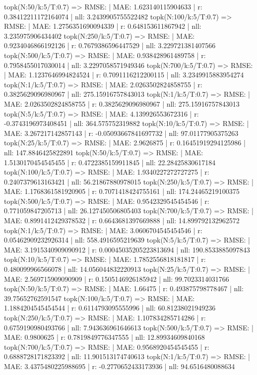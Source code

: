 topk(N:50/k:5/T:0.7) => RMSE: | MAE: 1.623140115904633 | r: 0.38412211172164074 | nll: 3.2439905755522482
topk(N:100/k:5/T:0.7) => RMSE: | MAE: 1.2756351690094339 | r: 0.648153611867942 | nll: 3.235975906434402
topk(N:250/k:5/T:0.7) => RMSE: | MAE: 0.9234046866192126 | r: 0.7679386596447529 | nll: 3.229721381407566
topk(N:500/k:5/T:0.7) => RMSE: | MAE: 0.938428961489758 | r: 0.7958455017030014 | nll: 3.2297058571949346
topk(N:700/k:5/T:0.7) => RMSE: | MAE: 1.1237646994824524 | r: 0.7091116212200115 | nll: 3.2349915883954274
topk(N:1/k:5/T:0.7) => RMSE: | MAE: 2.0263502824858755 | r: 0.3825629096980967 | nll: 275.15916757843013
topk(N:1/k:5/T:0.7) => RMSE: | MAE: 2.0263502824858755 | r: 0.3825629096980967 | nll: 275.15916757843013
topk(N:5/k:5/T:0.7) => RMSE: | MAE: 4.139926553672316 | r: -0.3743196973408451 | nll: 364.575752319882
topk(N:10/k:5/T:0.7) => RMSE: | MAE: 3.267217142857143 | r: -0.05093667841697732 | nll: 97.01177905375263
topk(N:25/k:5/T:0.7) => RMSE: | MAE: 2.9626875 | r: 0.16451919294125986 | nll: 147.8846425822891
topk(N:50/k:5/T:0.7) => RMSE: | MAE: 1.5130170454545455 | r: 0.4722385159911845 | nll: 22.28425830617184
topk(N:100/k:5/T:0.7) => RMSE: | MAE: 1.9340227272727275 | r: 0.2407379613163421 | nll: 56.21867880978015
topk(N:250/k:5/T:0.7) => RMSE: | MAE: 1.1768361581920905 | r: 0.7071418424755161 | nll: 174.24465219100375
topk(N:500/k:5/T:0.7) => RMSE: | MAE: 0.9542329545454546 | r: 0.771059847205713 | nll: 26.127450506805403
topk(N:700/k:5/T:0.7) => RMSE: | MAE: 0.8991412429378532 | r: 0.6643681397669888 | nll: 14.899792132962572
topk(N:1/k:5/T:0.7) => RMSE: | MAE: 3.0606704545454546 | r: 0.05462909232926314 | nll: 558.4916595219639
topk(N:5/k:5/T:0.7) => RMSE: | MAE: 3.1915340909090912 | r: 0.00045035205223813694 | nll: 190.8533885097843
topk(N:10/k:5/T:0.7) => RMSE: | MAE: 1.7852556818181817 | r: 0.480099966566078 | nll: 14.056044832220913
topk(N:25/k:5/T:0.7) => RMSE: | MAE: 2.569715909090909 | r: 0.1505146926185942 | nll: 99.7023314031766
topk(N:50/k:5/T:0.7) => RMSE: | MAE: 1.66475 | r: 0.493875798778467 | nll: 39.75652762591547
topk(N:100/k:5/T:0.7) => RMSE: | MAE: 1.1884204545454544 | r: 0.6114793095555996 | nll: 60.81238021949236
topk(N:250/k:5/T:0.7) => RMSE: | MAE: 1.107834285714286 | r: 0.6759190980493766 | nll: 7.943636961646613
topk(N:500/k:5/T:0.7) => RMSE: | MAE: 0.9800625 | r: 0.7819849776347555 | nll: 12.89934609840168
topk(N:700/k:5/T:0.7) => RMSE: | MAE: 0.9568920454545455 | r: 0.6888728171823392 | nll: 11.901513174740613
topk(N:1/k:5/T:0.7) => RMSE: | MAE: 3.4375480225988695 | r: -0.2770652433173936 | nll: 94.6516480088634
